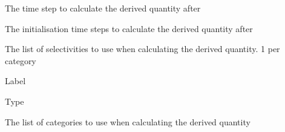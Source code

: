 
 {The time step to calculate the derived quantity after}

 {The initialisation time steps to calculate the derived quantity after}

 {The list of selectivities to use when calculating the derived quantity. 1 per category}

 {Label}

 {Type}

 {The list of categories to use when calculating the derived quantity}

\subsubsection[Abundance]{}

\subsubsection[Biomass]{}

